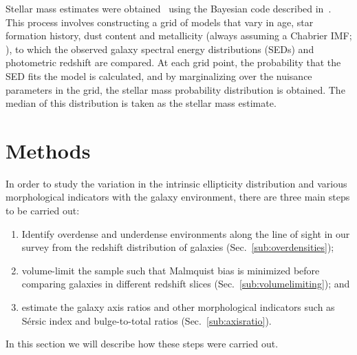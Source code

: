 \documentclass[twocolumn,useAMS,usenatbib]{mn2e}
\newcommand{\rachel}[1]{{\textcolor{red}{#1}}}
\newcommand{\sersic}{S\'{e}rsic }
\begin{document}
Stellar mass estimates were obtained~\citep{COSMOS_XRAY} using the
Bayesian code described in~\cite{KEVIN_MSTAR}.  This process involves
constructing a grid of models that vary in age, star formation
history, dust content and metallicity (always assuming a Chabrier IMF;
\citealt{ChabrierIMF}), 
 to which the observed galaxy spectral energy distributions (SEDs) and photometric redshift are compared. At each grid point, the probability that the 
SED fits the model is calculated, and by marginalizing over the nuisance parameters in the grid, the stellar mass probability distribution is obtained. The median of this distribution
is taken as the stellar mass estimate. 
  

\section{Methods}
\label{S:methods}

In order to study the variation in the intrinsic ellipticity
distribution and various morphological indicators with the galaxy environment, there are three main steps to be carried out:
\begin{enumerate}
 \item Identify overdense and underdense environments along the line of sight in our survey
   from the redshift distribution of galaxies (Sec.~\ref{sub:overdensities});
 \item volume-limit the sample such that Malmquist bias is minimized
   before comparing galaxies in different redshift slices
   (Sec.~\ref{sub:volumelimiting}); and 
 \item estimate the galaxy axis ratios and other morphological indicators such as  \sersic index and bulge-to-total ratios (Sec.~\ref{sub:axisratio}).
\end{enumerate}

In this section we will describe how these steps were carried out.

\end{document}
